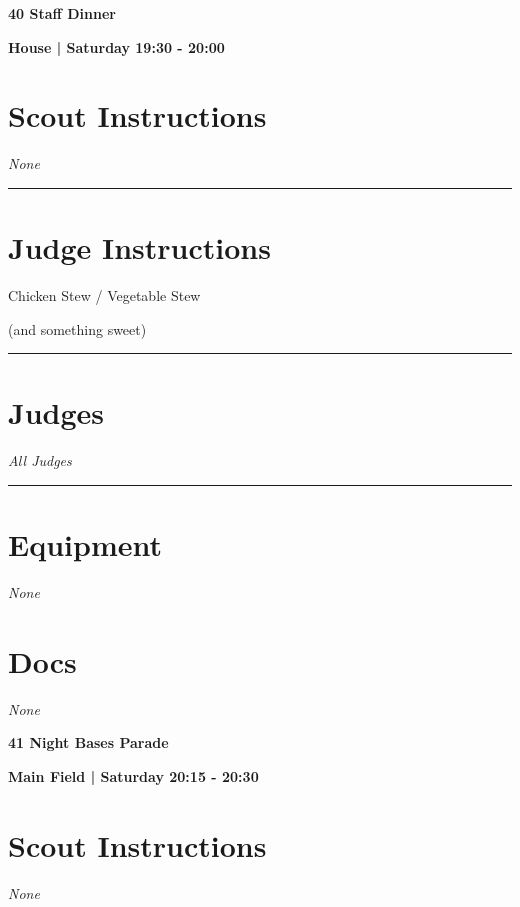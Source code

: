 \documentclass[10pt]{article}
\newcommand{\newtitle}[1]{\begin{center}{\Huge\bfseries #1 }\\ \vspace{5mm}\end{center}}
\newcommand{\newsubtitle}[1]{\begin{center}{\color{grey}\Large\bfseries #1 }\\ \vspace{5mm}\end{center}}
\begin{document}
	\vspace{1cm}


	\clearpage
		\newtitle{40 Staff Dinner }
	\newsubtitle{House | Saturday 19:30 - 20:00}
		\setcounter{section}{39}
	\section*{Scout Instructions}
		\textit{None}
	
	\vspace{0.5cm}
	\hrule
	\vspace{0.5cm}

		\section*{Judge Instructions}
		Chicken Stew / Vegetable Stew 

(and something sweet)
\vspace{0.5cm}
	\hrule
	\vspace{0.5cm}
		\section*{\faUsers \: Judges}

					\textit{All Judges}
			\vspace{0.5cm}
	\hrule
	\vspace{0.5cm}

	\begin{multicols}{2}

		\section*{\faWrench \: Equipment}

				\textit{None}
		
		\vfill\null
		\columnbreak

			\section*{\faFile \: Docs}
		 	\textit{None}
	

		\vfill\null

		\end{multicols}



	\vspace{1cm}


	\clearpage
		\newtitle{41 Night Bases Parade }
	\newsubtitle{Main Field | Saturday 20:15 - 20:30}
		\setcounter{section}{40}
	\section*{Scout Instructions}
		\textit{None}
	
\end{document}
